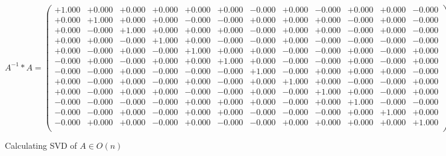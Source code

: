 \documentclass[9pt]{article}
\theoremstyle{plain}
\theoremstyle{definition}
\theoremstyle{remark}
\numberwithin{equation}{section}
\begin{document}
$A^{-1} *A = \left(
\begin{array}{
cccccccccccc}
+1.000 & +0.000 & +0.000 & +0.000 & +0.000 & +0.000 & -0.000 & +0.000 & -0.000 & +0.000 & +0.000 & -0.000 \\
+0.000 & +1.000 & +0.000 & +0.000 & -0.000 & -0.000 & +0.000 & +0.000 & +0.000 & -0.000 & +0.000 & -0.000 \\
+0.000 & -0.000 & +1.000 & +0.000 & +0.000 & +0.000 & -0.000 & +0.000 & +0.000 & -0.000 & +0.000 & -0.000 \\
+0.000 & +0.000 & -0.000 & +1.000 & +0.000 & -0.000 & -0.000 & +0.000 & -0.000 & -0.000 & -0.000 & -0.000 \\
+0.000 & -0.000 & +0.000 & -0.000 & +1.000 & +0.000 & +0.000 & -0.000 & -0.000 & +0.000 & -0.000 & +0.000 \\
-0.000 & +0.000 & -0.000 & +0.000 & +0.000 & +1.000 & +0.000 & -0.000 & -0.000 & +0.000 & -0.000 & +0.000 \\
-0.000 & -0.000 & +0.000 & -0.000 & -0.000 & -0.000 & +1.000 & -0.000 & +0.000 & +0.000 & +0.000 & -0.000 \\
+0.000 & -0.000 & +0.000 & -0.000 & +0.000 & -0.000 & +0.000 & +1.000 & +0.000 & -0.000 & -0.000 & +0.000 \\
+0.000 & -0.000 & +0.000 & +0.000 & -0.000 & -0.000 & +0.000 & -0.000 & +1.000 & +0.000 & -0.000 & +0.000 \\
-0.000 & -0.000 & -0.000 & -0.000 & +0.000 & +0.000 & +0.000 & -0.000 & +0.000 & +1.000 & -0.000 & -0.000 \\
-0.000 & -0.000 & +0.000 & -0.000 & +0.000 & +0.000 & -0.000 & -0.000 & -0.000 & +0.000 & +1.000 & +0.000 \\
-0.000 & +0.000 & +0.000 & -0.000 & +0.000 & -0.000 & -0.000 & +0.000 & +0.000 & +0.000 & +0.000 & +1.000 \\
\end{array}
\right)$ \newline 

Calculating SVD of  $A \in O(n)$
\end{document}
